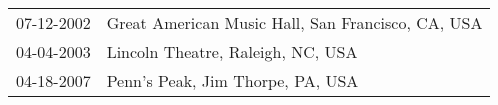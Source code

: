 \begin{supertabular}{ll}
 07-12-2002 &  Great American Music Hall, San Francisco, CA, USA \\
 04-04-2003 &                  Lincoln Theatre, Raleigh, NC, USA \\
 04-18-2007 &                   Penn's Peak, Jim Thorpe, PA, USA \\
\end{supertabular}
